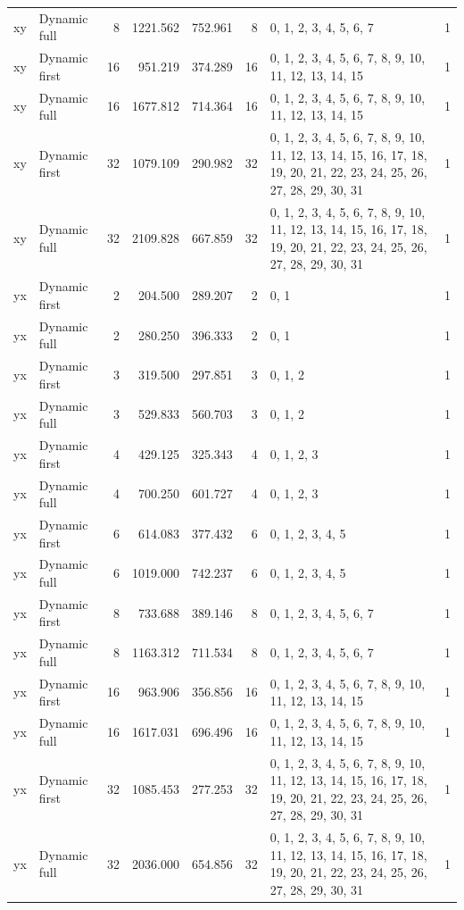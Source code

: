 \documentclass[10pt,a4paper]{article}
\begin{document}
\begin{longtable}{@{}p{23mm}p{29mm}rrrrp{36mm}r@{}}
xy & Dynamic full & 8 & 1221.562 & 752.961 & 8 & 0, 1, 2, 3, 4, 5, 6, 7 & 1 \\
xy & Dynamic first & 16 & 951.219 & 374.289 & 16 & 0, 1, 2, 3, 4, 5, 6, 7, 8, 9, 10, 11, 12, 13, 14, 15 & 1 \\
xy & Dynamic full & 16 & 1677.812 & 714.364 & 16 & 0, 1, 2, 3, 4, 5, 6, 7, 8, 9, 10, 11, 12, 13, 14, 15 & 1 \\
xy & Dynamic first & 32 & 1079.109 & 290.982 & 32 & 0, 1, 2, 3, 4, 5, 6, 7, 8, 9, 10, 11, 12, 13, 14, 15, 16, 17, 18, 19, 20, 21, 22, 23, 24, 25, 26, 27, 28, 29, 30, 31 & 1 \\
xy & Dynamic full & 32 & 2109.828 & 667.859 & 32 & 0, 1, 2, 3, 4, 5, 6, 7, 8, 9, 10, 11, 12, 13, 14, 15, 16, 17, 18, 19, 20, 21, 22, 23, 24, 25, 26, 27, 28, 29, 30, 31 & 1 \\
yx & Dynamic first & 2 & 204.500 & 289.207 & 2 & 0, 1 & 1 \\
yx & Dynamic full & 2 & 280.250 & 396.333 & 2 & 0, 1 & 1 \\
yx & Dynamic first & 3 & 319.500 & 297.851 & 3 & 0, 1, 2 & 1 \\
yx & Dynamic full & 3 & 529.833 & 560.703 & 3 & 0, 1, 2 & 1 \\
yx & Dynamic first & 4 & 429.125 & 325.343 & 4 & 0, 1, 2, 3 & 1 \\
yx & Dynamic full & 4 & 700.250 & 601.727 & 4 & 0, 1, 2, 3 & 1 \\
yx & Dynamic first & 6 & 614.083 & 377.432 & 6 & 0, 1, 2, 3, 4, 5 & 1 \\
yx & Dynamic full & 6 & 1019.000 & 742.237 & 6 & 0, 1, 2, 3, 4, 5 & 1 \\
yx & Dynamic first & 8 & 733.688 & 389.146 & 8 & 0, 1, 2, 3, 4, 5, 6, 7 & 1 \\
yx & Dynamic full & 8 & 1163.312 & 711.534 & 8 & 0, 1, 2, 3, 4, 5, 6, 7 & 1 \\
yx & Dynamic first & 16 & 963.906 & 356.856 & 16 & 0, 1, 2, 3, 4, 5, 6, 7, 8, 9, 10, 11, 12, 13, 14, 15 & 1 \\
yx & Dynamic full & 16 & 1617.031 & 696.496 & 16 & 0, 1, 2, 3, 4, 5, 6, 7, 8, 9, 10, 11, 12, 13, 14, 15 & 1 \\
yx & Dynamic first & 32 & 1085.453 & 277.253 & 32 & 0, 1, 2, 3, 4, 5, 6, 7, 8, 9, 10, 11, 12, 13, 14, 15, 16, 17, 18, 19, 20, 21, 22, 23, 24, 25, 26, 27, 28, 29, 30, 31 & 1 \\
yx & Dynamic full & 32 & 2036.000 & 654.856 & 32 & 0, 1, 2, 3, 4, 5, 6, 7, 8, 9, 10, 11, 12, 13, 14, 15, 16, 17, 18, 19, 20, 21, 22, 23, 24, 25, 26, 27, 28, 29, 30, 31 & 1 \\
\end{longtable}\normalsize\setlength{\tabcolsep}{6pt}
\clearpage
\end{document}
